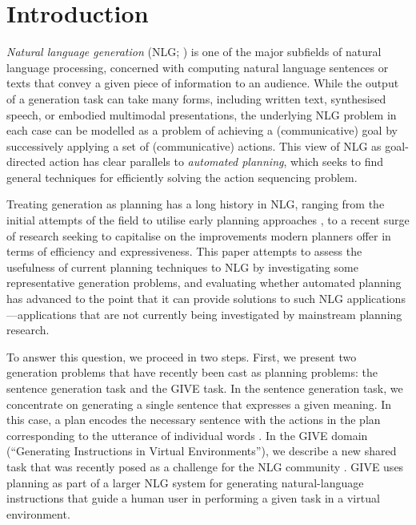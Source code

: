 \section{Introduction}
\label{sec:introduction}

\emph{Natural language generation} (NLG; \citealp{reiter00building}) is one of
the major subfields of natural language processing, concerned with computing
natural language sentences or texts that convey a given piece of information to
an audience. While the output of a generation task can take many forms,
including written text, synthesised speech, or embodied multimodal
presentations, the underlying NLG problem in each case can be modelled as a
problem of achieving a (communicative) goal by successively applying a set of
(communicative) actions. This view of NLG as goal-directed action has clear
parallels to \emph{automated planning}, which seeks to find general techniques
for efficiently solving the action sequencing problem.

Treating generation as planning has a long history in NLG, ranging
from the initial attempts of the field to utilise early planning
approaches \citep{perrault80,appelt:planning,hovy88,young94dpocl}, to
a recent surge of research
\citep{Steedman-Petrick:07,KolSto07,brenner08:_contin_multiag_plann_approac_to_situat_dialog,benotti08b}
seeking to capitalise on the improvements modern planners offer in
terms of efficiency and expressiveness. This paper attempts to assess
the usefulness of current planning techniques to NLG by investigating
some representative generation problems, and evaluating whether
automated planning has advanced to the point that it can provide
solutions to such NLG applications---applications that are not
currently being investigated by mainstream planning research.

To answer this question, we proceed in two steps. First, we present
two generation problems that have recently been cast as planning
problems: the sentence generation task and the GIVE task. In the
sentence generation task, we concentrate on generating a single
sentence that expresses a given meaning. In this case, a plan encodes
the necessary sentence with the actions in the plan corresponding to
the utterance of individual words \citep{KolSto07}. In the GIVE domain
(``Generating Instructions in Virtual Environments''), we describe a
new shared task that was recently posed as a challenge for the NLG
community \citep{ByrKolStrCasDalMooObe09}. GIVE uses planning as part
of a larger NLG system for generating natural-language instructions
that guide a human user in performing a given task in a virtual
environment.

